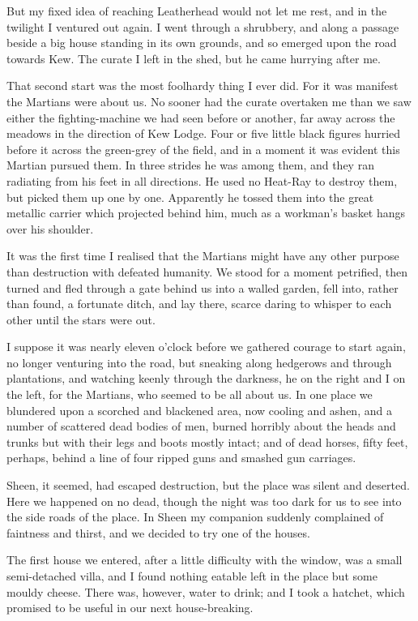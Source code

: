 But my fixed idea of reaching Leatherhead would not let me rest,
and in the twilight I ventured out again. I went through a
shrubbery, and along a passage beside a big house standing in its
own grounds, and so emerged upon the road towards Kew. The curate I
left in the shed, but he came hurrying after me.

That second start was the most foolhardy thing I ever did. For it
was manifest the Martians were about us. No sooner had the curate
overtaken me than we saw either the fighting-machine we had seen
before or another, far away across the meadows in the direction of
Kew Lodge. Four or five little black figures hurried before it
across the green-grey of the field, and in a moment it was evident
this Martian pursued them. In three strides he was among them, and
they ran radiating from his feet in all directions. He used no
Heat-Ray to destroy them, but picked them up one by one. Apparently
he tossed them into the great metallic carrier which projected
behind him, much as a workman's basket hangs over his shoulder.

It was the first time I realised that the Martians might have any
other purpose than destruction with defeated humanity. We stood for
a moment petrified, then turned and fled through a gate behind us
into a walled garden, fell into, rather than found, a fortunate
ditch, and lay there, scarce daring to whisper to each other until
the stars were out.

I suppose it was nearly eleven o'clock before we gathered courage
to start again, no longer venturing into the road, but sneaking
along hedgerows and through plantations, and watching keenly
through the darkness, he on the right and I on the left, for the
Martians, who seemed to be all about us. In one place we blundered
upon a scorched and blackened area, now cooling and ashen, and a
number of scattered dead bodies of men, burned horribly about the
heads and trunks but with their legs and boots mostly intact; and
of dead horses, fifty feet, perhaps, behind a line of four ripped
guns and smashed gun carriages.

Sheen, it seemed, had escaped destruction, but the place was silent
and deserted. Here we happened on no dead, though the night was too
dark for us to see into the side roads of the place. In Sheen my
companion suddenly complained of faintness and thirst, and we
decided to try one of the houses.

The first house we entered, after a little difficulty with the
window, was a small semi-detached villa, and I found nothing
eatable left in the place but some mouldy cheese. There was,
however, water to drink; and I took a hatchet, which promised to be
useful in our next house-breaking.

